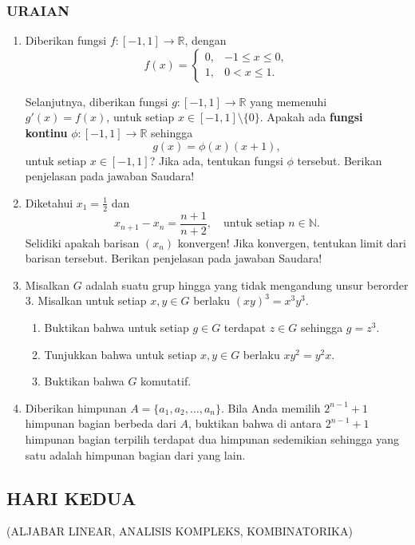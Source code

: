 \documentclass[12pt,twoside]{article}
\begin{document}
\subsubsection*{URAIAN}
\begin{enumerate}
	\item Diberikan fungsi $f : [-1,1] \to \mathbb{R}$, dengan
	      \[
		      f(x) =
		      \begin{cases}
			      0, & -1 \leq x \leq 0, \\
			      1, & 0 < x \leq 1.
		      \end{cases}
	      \]

	      Selanjutnya, diberikan fungsi $g : [-1,1] \to \mathbb{R}$ yang memenuhi $g'(x) = f(x)$, untuk setiap $x \in [-1,1] \setminus \{0\}$. Apakah ada \textbf{fungsi kontinu} $\phi : [-1,1] \to \mathbb{R}$ sehingga
	      \[
		      g(x) = \phi(x)(x+1),
	      \]
	      untuk setiap $x \in [-1,1]$? Jika ada, tentukan fungsi $\phi$ tersebut. Berikan penjelasan pada jawaban Saudara!

	\item Diketahui $x_1 = \frac{1}{2}$ dan
	      \[
		      x_{n+1} - x_n = \frac{n+1}{n+2}, \quad \text{untuk setiap } n \in \mathbb{N}.
	      \]
	      Selidiki apakah barisan $(x_n)$ konvergen! Jika konvergen, tentukan limit dari barisan tersebut. Berikan penjelasan pada jawaban Saudara!

	\item Misalkan $G$ adalah suatu grup hingga yang tidak mengandung unsur berorder 3. Misalkan untuk setiap $x,y \in G$ berlaku $(xy)^3 = x^3 y^3$.
	      \begin{enumerate}
		      \item Buktikan bahwa untuk setiap $g \in G$ terdapat $z \in G$ sehingga $g = z^3$.
		      \item Tunjukkan bahwa untuk setiap $x, y \in G$ berlaku $xy^2 = y^2 x$.
		      \item Buktikan bahwa $G$ komutatif.
	      \end{enumerate}

	\item Diberikan himpunan $A = \{a_1, a_2, \dots, a_n\}$. Bila Anda memilih $2^{n-1} + 1$ himpunan bagian berbeda dari $A$, buktikan bahwa di antara $2^{n-1} + 1$ himpunan bagian terpilih terdapat dua himpunan sedemikian sehingga yang satu adalah himpunan bagian dari yang lain.
\end{enumerate}
\newpage
\subsection{HARI KEDUA}
\begin{center}
	(ALJABAR LINEAR, ANALISIS KOMPLEKS, KOMBINATORIKA)
\end{center}
\end{document}
